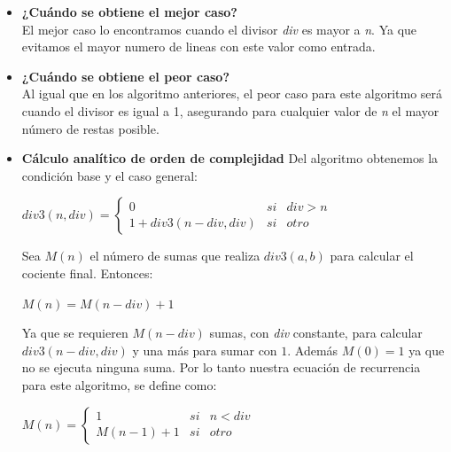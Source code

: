 \documentclass{report}
\begin{document}
            \begin{itemize}
                \item\textbf{¿Cu\'ando se obtiene el mejor caso?}\\
                El mejor caso lo encontramos cuando el divisor \textit{div} es mayor a \textit{n}. Ya que evitamos el mayor numero de lineas con este valor como entrada.
                \item\textbf{¿Cu\'ando se obtiene el peor caso?}\\
                Al igual que en los algoritmo anteriores, el peor caso para este algoritmo será cuando el divisor es igual a 1, asegurando para cualquier valor de \textit{n} el mayor número de restas posible.
                \item\textbf{C\'alculo anal\'itico de orden de complejidad}
                Del algoritmo obtenemos la condición base y el caso general:
                \begin{center}
                    $div3(n,div) = 
                    \left\{
                        \begin{array}{lcc}
                            0 & si & div>n\\
                            1+div3(n-div,div) & si & otro
                        \end{array}
                    \right.$
                \end{center}
                Sea $M(n)$ el n\'umero de sumas que realiza $div3(a,b)$ para calcular el cociente final. Entonces:
                \begin{center} 
                    $M(n)=M(n-div)+1$
                \end{center}
                Ya que se requieren $M(n-div)$ sumas, con \textit{div} constante, para calcular $div3(n-div,div)$ y una más para sumar con $1$. Adem\'as $M(0)=1$ ya que no se ejecuta ninguna suma. Por lo tanto nuestra ecuaci\'on de recurrencia para este algoritmo, se define como:
                \begin{center}
                    $M(n) = 
                    \left\{
                        \begin{array}{lcc}
                            1 & si & n<div
                            \\
                            M(n-1)+1 & si & otro
                        \end{array}
                    \right.$\\
                \end{center}

\end{itemize}
\end{document}
